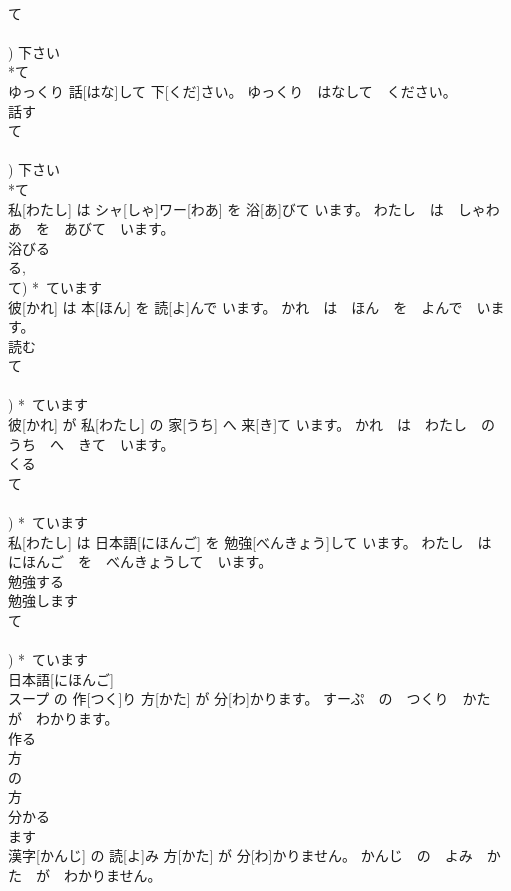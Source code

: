 \documentclass[8pt]{extreport}
\begin{document}
\begin{CJK}{UTF8}{min}
\\	て 
\\	[く/ぐ] 
\\	[いて/いで])	下さい 
\\	*て 
\\	ゆっくり 話[はな]して 下[くだ]さい。	ゆっくり　はなして　ください。	
\\	話す 
\\	て 
\\	[す] 
\\	[して])	下さい 
\\	*て 
\\	私[わたし] は シャ[しゃ]ワー[わあ] を 浴[あ]びて います。	わたし　は　しゃわあ　を　あびて　います。	
\\	浴びる 
\\	る, 
\\	て)	*~ています 
\\	彼[かれ] は 本[ほん] を 読[よ]んで います。	かれ　は　ほん　を　よんで　います。	
\\	読む 
\\	て 
\\	[む/ぶ/ぬ] 
\\	[んで])	*~ています 
\\	彼[かれ] が 私[わたし] の 家[うち] へ 来[き]て います。	かれ　は　わたし　の　うち　へ　きて　います。	
\\	くる 
\\	て 
\\	[くる] 
\\	[きて])	*~ています 
\\	私[わたし] は 日本語[にほんご] を 勉強[べんきょう]して います。	わたし　は　にほんご　を　べんきょうして　います。	
\\	勉強する 
\\	勉強します 
\\	て 
\\	[する] 
\\	[して])	*~ています 
\\	日本語[にほんご] 
\\	スープ の 作[つく]り 方[かた] が 分[わ]かります。	すーぷ　の　つくり　かた　が　わかります。	
\\	作る 
\\	方 
\\	の
\\	方 
\\	分かる 
\\	ます 
\\	漢字[かんじ] の 読[よ]み 方[かた] が 分[わ]かりません。	かんじ　の　よみ　かた　が　わかりません。	

\end{CJK}
\end{document}
